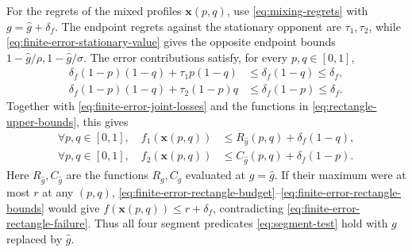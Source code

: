 \documentclass[11pt]{article}
\theoremstyle{remark}
\theoremstyle{plain}
\begin{document}
For the regrets of the mixed profiles $\boldsymbol x(p,q)$, use
\eqref{eq:mixing-regrets} with
$g=\hat g+\delta_f$. The endpoint regrets against the stationary
opponent are $\tau_1,\tau_2$, while
\eqref{eq:finite-error-stationary-value} gives the opposite endpoint
bounds $1-\hat g/\rho,1-\hat g/\sigma$.
The error contributions satisfy, for every $p,q\in[0,1]$,
\begin{equation}
 \begin{aligned}
 \delta_f(1-p)(1-q)+\tau_1p(1-q)
     &\le\delta_f(1-q)\le\delta_f,\\
 \delta_f(1-p)(1-q)+\tau_2(1-p)q
     &\le\delta_f(1-p)\le\delta_f.
 \end{aligned}
 \label{eq:finite-error-rectangle-budget}
\end{equation}
Together with \eqref{eq:finite-error-joint-losses} and the
functions in \eqref{eq:rectangle-upper-bounds}, this gives
\begin{equation}
 \begin{aligned}
 \forall p,q\in[0,1],\quad f_1(\boldsymbol x(p,q))
     &\le R_{\hat g}(p,q)+\delta_f(1-q),\\
 \forall p,q\in[0,1],\quad f_2(\boldsymbol x(p,q))
     &\le C_{\hat g}(p,q)+\delta_f(1-p).
 \end{aligned}
 \label{eq:finite-error-rectangle-bounds}
\end{equation}
Here $R_{\hat g},C_{\hat g}$ are the functions $R_g,C_g$ evaluated at
$g=\hat g$. If their maximum were at most $r$ at any $(p,q)$,
\eqref{eq:finite-error-rectangle-budget}--\eqref{eq:finite-error-rectangle-bounds}
would give $f(\boldsymbol x(p,q))\le r+\delta_f$, contradicting
\eqref{eq:finite-error-rectangle-failure}.
Thus all four segment predicates \eqref{eq:segment-test} hold
with $g$ replaced by $\hat g$.
\end{document}
